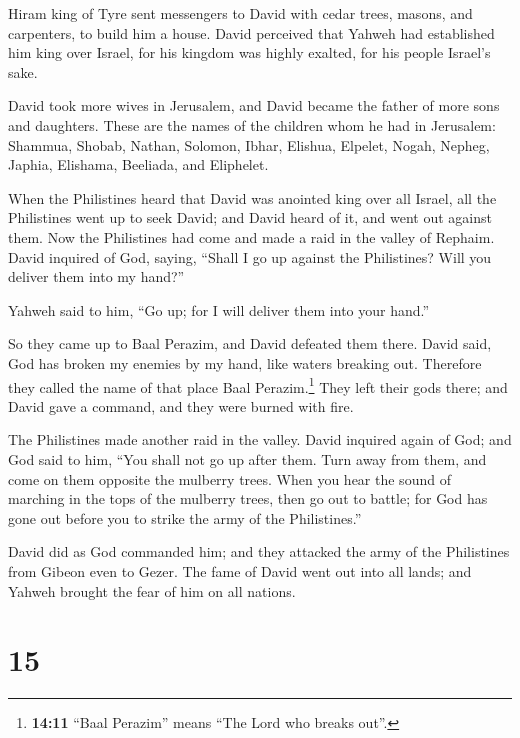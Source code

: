  Hiram king of Tyre sent messengers to David with cedar
trees, masons, and carpenters, to build him a house. 
David perceived that Yahweh had established him king over Israel, for
his kingdom was highly exalted, for his people Israel's sake.

 David took more wives in Jerusalem, and David became the
father of more sons and daughters.  These are the names of
the children whom he had in Jerusalem: Shammua, Shobab, Nathan, Solomon,
 Ibhar, Elishua, Elpelet,  Nogah, Nepheg,
Japhia,  Elishama, Beeliada, and Eliphelet.

 When the Philistines heard that David was anointed king
over all Israel, all the Philistines went up to seek David; and David
heard of it, and went out against them.  Now the
Philistines had come and made a raid in the valley of Rephaim.
 David inquired of God, saying, ``Shall I go up against
the Philistines? Will you deliver them into my hand?''

Yahweh said to him, ``Go up; for I will deliver them into your hand.''

 So they came up to Baal Perazim, and David defeated them
there. David said, God has broken my enemies by my hand, like waters
breaking out. Therefore they called the name of that place Baal
Perazim.\footnote{\textbf{14:11} ``Baal Perazim'' means ``The Lord who
  breaks out''.}  They left their gods there; and David
gave a command, and they were burned with fire.

 The Philistines made another raid in the valley.
 David inquired again of God; and God said to him, ``You
shall not go up after them. Turn away from them, and come on them
opposite the mulberry trees.  When you hear the sound of
marching in the tops of the mulberry trees, then go out to battle; for
God has gone out before you to strike the army of the Philistines.''

 David did as God commanded him; and they attacked the
army of the Philistines from Gibeon even to Gezer.  The
fame of David went out into all lands; and Yahweh brought the fear of
him on all nations.

\hypertarget{section-14}{%
\section{15}\label{section-14}}

